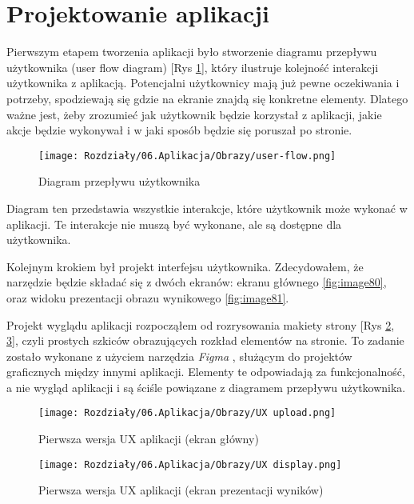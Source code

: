 \section{Projektowanie aplikacji}

Pierwszym etapem tworzenia aplikacji było stworzenie diagramu przepływu użytkownika (user flow diagram) [Rys \ref{fig:image82}], który ilustruje kolejność interakcji użytkownika z aplikacją. Potencjalni użytkownicy mają już pewne oczekiwania i potrzeby, spodziewają się gdzie na ekranie znajdą się konkretne elementy. Dlatego ważne jest, żeby zrozumieć jak użytkownik będzie korzystał z aplikacji, jakie akcje będzie wykonywał i w jaki sposób będzie się poruszał po stronie.

\begin{figure}[ht]
    \centering
    \texttt{[image: Rozdziały/06.Aplikacja/Obrazy/user-flow.png]}  
    \caption{Diagram przepływu użytkownika}
    \label{fig:image82}
\end{figure}

Diagram ten przedstawia wszystkie interakcje, które użytkownik może wykonać w aplikacji. Te interakcje nie muszą być wykonane, ale są dostępne dla użytkownika.

Kolejnym krokiem był projekt interfejsu użytkownika. Zdecydowałem, że narzędzie będzie składać się z dwóch ekranów: ekranu głównego \ref{fig:image80}, oraz widoku prezentacji obrazu wynikowego \ref{fig:image81}.

Projekt wyglądu aplikacji rozpocząłem od rozrysowania makiety strony [Rys \ref{fig:image83}, \ref{fig:image84}], czyli prostych szkiców obrazujących rozkład elementów na stronie. To zadanie zostało wykonane z użyciem narzędzia \textit{Figma} \cite{figma}, służącym do projektów graficznych między innymi aplikacji. Elementy te odpowiadają za funkcjonalność, a nie wygląd aplikacji i są ściśle powiązane z diagramem przepływu użytkownika.

\begin{figure}[ht]
    \centering
    \texttt{[image: Rozdziały/06.Aplikacja/Obrazy/UX upload.png]}  
    \caption{Pierwsza wersja UX aplikacji (ekran główny)}
    \label{fig:image83}
\end{figure}

\begin{figure}[ht]
    \centering
    \texttt{[image: Rozdziały/06.Aplikacja/Obrazy/UX display.png]}  
    \caption{Pierwsza wersja UX aplikacji (ekran prezentacji wyników)}
    \label{fig:image84}
\end{figure}

